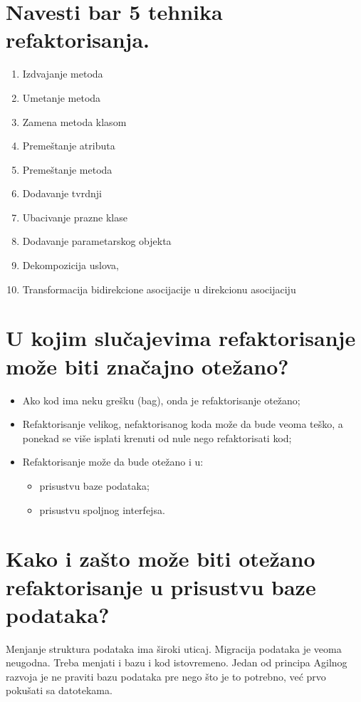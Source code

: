 \documentclass[a4paper]{article}
\begin{document}
\section{Navesti bar 5 tehnika refaktorisanja.}
  \begin{enumerate}
    \item Izdvajanje metoda
    \item Umetanje metoda
    \item Zamena metoda klasom
    \item Premeštanje atributa
    \item Premeštanje metoda
    \item Dodavanje tvrdnji
    \item Ubacivanje prazne klase
    \item Dodavanje parametarskog objekta
    \item Dekompozicija uslova,
    \item Transformacija bidirekcione asocijacije u direkcionu asocijaciju
  \end{enumerate}

\section{U kojim slučajevima refaktorisanje može biti značajno otežano?}
  \begin{itemize}
    \item Ako kod ima neku grešku (bag), onda je refaktorisanje otežano; 
    \item Refaktorisanje velikog, nefaktorisanog koda može da bude veoma teško, 
          a ponekad se više isplati krenuti od nule nego refaktorisati kod; 
    \item Refaktorisanje može da bude otežano i u:
          \begin{itemize}
            \item prisustvu baze podataka;
            \item prisustvu spoljnog interfejsa.
          \end{itemize}
  \end{itemize}

\section{Kako i zašto može biti otežano refaktorisanje u prisustvu baze podataka?}
  Menjanje struktura podataka ima široki uticaj. Migracija podataka je veoma neugodna. Treba
  menjati i bazu i kod istovremeno. Jedan od principa Agilnog razvoja je ne praviti bazu podataka
  pre nego što je to potrebno, već prvo pokušati sa datotekama.\\
\end{document}
